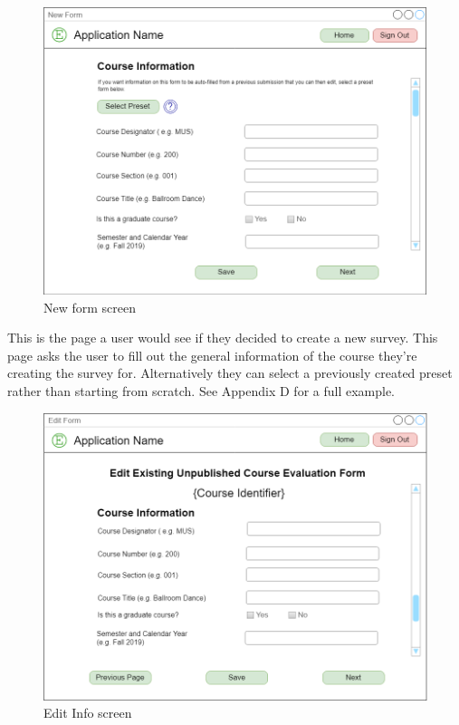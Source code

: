 \documentclass{article}
\begin{document}
\begin{center}
\begin{figure}[H]
    \centering
    \caption{New form screen}
    \includegraphics[scale=.35]{images/create_screen.png}
\end{figure}
\end{center}

This is the page a user would see if they decided to create a new survey. This page asks the user to fill out the general information of the course they're creating the survey for. Alternatively they can select a previously created preset rather than starting from scratch.  See Appendix D for a full example.

\begin{center}
\begin{figure}[H]
    \centering
    \caption{Edit Info screen}
    \includegraphics[scale=.30]{images/edit_info_screen.png}
\end{figure}
\end{center}
\end{document}
